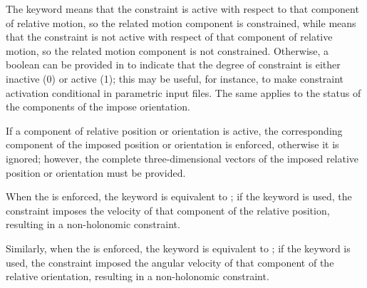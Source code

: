The keyword  means that the constraint is active
with respect to that component of relative motion,
so the related motion component is constrained,
while  means that the constraint is not active
with respect of that component of relative motion,
so the related motion component is not constrained.
Otherwise, a boolean can be provided in  to indicate
that the degree of constraint is either inactive (0) or active (1);
this may be useful, for instance, to make constraint activation
conditional in parametric input files.
The same applies to the status of the components of the impose orientation.

If a component of relative position or orientation is active,
the corresponding component of the imposed position or orientation
is enforced, otherwise it is ignored;
however, the complete three-dimensional vectors of the imposed relative
position or orientation must be provided.

When the  is enforced, the keyword 
is equivalent to ; if the keyword  is used,
the constraint imposes the velocity of that component of the relative position,
resulting in a non-holonomic constraint.

Similarly, when the  is enforced,
the keyword  is equivalent to ;
if the keyword  is used,
the constraint imposed the angular velocity of that component
of the relative orientation, resulting in a non-holonomic constraint.


